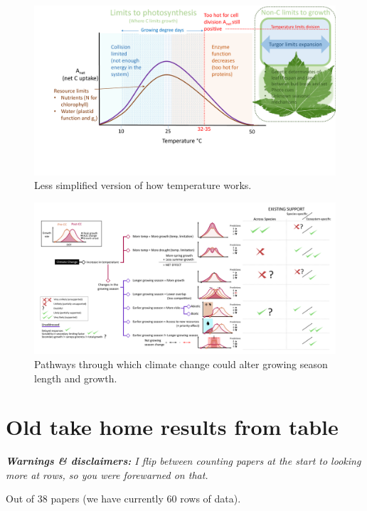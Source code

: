\documentclass[11pt]{article}
\begin{document}
\begin{figure}[h!]
\includegraphics[width=1\textwidth]{..//figures/grephonfig.pdf}
\caption{Less simplified version of how temperature works.}
\label{fig:temperaturecomplex}
\end{figure}


\begin{figure}[h!]
\includegraphics[width=1\textwidth]{..//figures/some conceptual figure2.0.png}
\caption{Pathways through which climate change could alter growing season length and growth.}
\label{fig:pathways}
\end{figure}


\clearpage

\section{Old take home results from table}

\emph{{\bf Warnings \& disclaimers:}
I flip between counting papers at the start to looking more at rows, so you were forewarned on that. }



Out of 38 papers (we have currently 60 rows of data).
\end{document}
